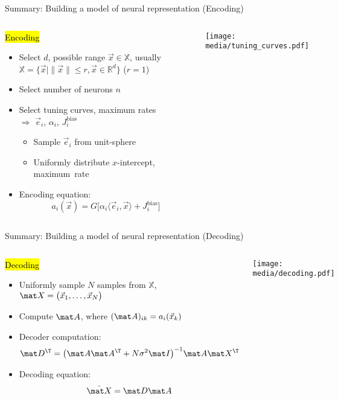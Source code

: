 \documentclass[handout,aspectratio=169]{beamer}
\begin{document}
\begin{frame}{Summary: Building a model of neural representation (Encoding)}
	\begin{columns}[c]
		\begin{block}{\hl{Encoding}}
		\begin{itemize}
			\setlength{\itemsep}{0.25cm}
			\item Select $d$, possible range $\vec x \in \mathbb{X}$, usually $\mathbb{X} = \big\{ \vec x \mid \| \vec x \| \leq r, \vec x \in \mathbb{R}^d \big\}$ ($r = 1$)
			\item Select number of neurons $n$
			\item Select tuning curves, maximum rates\\$\Rightarrow$ $\vec e_i$, $\alpha_i$, $J^\mathrm{bias}_i$\\[0.125cm]
			\begin{itemize}
				\setlength{\itemsep}{0.125cm}
				\item Sample $\vec e_i$ from unit-sphere
				\item Uniformly distribute $x$-intercept, maximum~rate
			\end{itemize}
			\item Encoding equation:\vspace{-0.25cm}
			$$a_i(\vec x) = G\big[ \alpha_i \langle \vec e_i, \vec x \rangle + J^\mathrm{bias}_i\big]$$
		\end{itemize}
		\end{block}
		\texttt{[image: media/tuning\_curves.pdf]}
	\end{columns}
\end{frame}

\begin{frame}{Summary: Building a model of neural representation (Decoding)}
	\begin{columns}
		\begin{block}{\hl{Decoding}}
		\begin{itemize}
			\setlength{\itemsep}{0.25cm}
			\item Uniformly sample $N$ samples from $\mathbb{X}$, $\mat X = \big( \vec x_1, \ldots, \vec x_N \big)$
			\item Compute $\mat A$, where $(\mat A)_{ik} = a_i(\vec x_k)$
			\item Decoder computation:\vspace{-0.25cm}
			$$\mat D^\T = \big( \mat A \mat A^\T + N \sigma^2 \mat I \big)^{-1} \mat A \mat X^\T$$
			\item Decoding equation:\vspace{-0.25cm}
			$$\hat{\mat X} = \mat D \mat A$$
		\end{itemize}
		\end{block}
		\texttt{[image: media/decoding.pdf]}
	\end{columns}
\end{frame}
\end{document}
